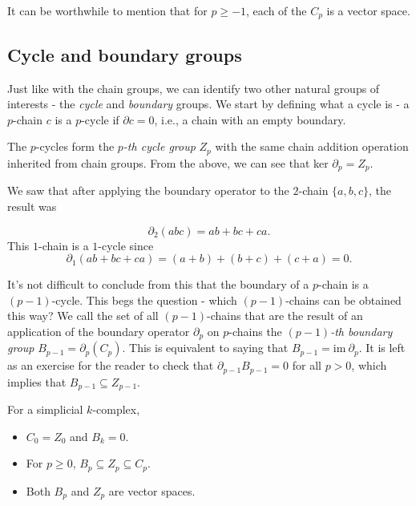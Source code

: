 \begin{figure}[h]
\end{figure}
It can be worthwhile to mention that for $p \geq -1$, each of the $C_{p}$ is a vector space.

\subsection{Cycle and boundary groups}
Just like with the chain groups, we can identify two other natural groups of interests - the \textit{cycle} and \textit{boundary} groups. We start by defining what a cycle is - a $p$-chain $c$ is a $p$-cycle if $\partial c = 0$, i.e., a chain with an empty boundary.

The $p$-cycles form the \textit{$p$-th cycle group} $Z_{p}$ with the same chain addition operation inherited from chain groups. From the above, we can see that ker $\partial_{p} = Z_{p}$.

We saw that after applying the boundary operator to the $2$-chain $\{a,b,c\}$, the result was

\begin{equation*}
\partial_2(abc) = ab + bc + ca.
\end{equation*}
This $1$-chain is a $1$-cycle since
\begin{equation*}
\partial_{1}(ab + bc + ca) = (a+b) + (b+c) + (c+a) = 0.
\end{equation*}

It's not difficult to conclude from this that the boundary of a $p$-chain is a $(p-1)$-cycle. This begs the question - which $(p-1)$-chains can be obtained this way? We call the set of all $(p-1)$-chains that are the result of an application of the boundary operator $\partial_{p}$ on $p$-chains the \textit{$(p-1)$-th boundary group} $B_{p-1} = \partial_{p}(C_{p})$. This is equivalent to saying that $B_{p-1} = \text{im} \: \partial_{p}$. It is left as an exercise for the reader to check that $\partial_{p-1}B_{p-1} = 0$ for all $p>0$, which implies that $B_{p-1} \subseteq Z_{p-1}$.

\begin{theorem}
  For a simplicial $k$-complex,
  \begin{itemize}
    \item $C_{0} = Z_{0}$ and $B_{k} = 0$.
    \item For $p \geq 0$, $B_{p} \subseteq Z_{p} \subseteq C_{p}$.
    \item Both $B_{p}$ and $Z_{p}$ are vector spaces.
  \end{itemize}
\end{theorem}

